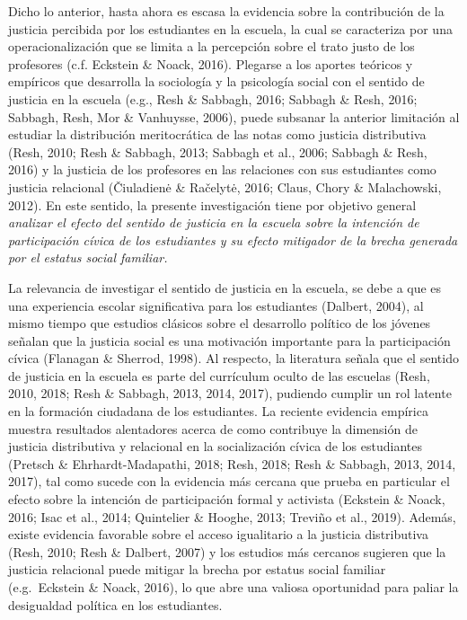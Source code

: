 \documentclass[12pt,twoside]{templates/facsothesis}
\begin{document}
Dicho lo anterior, hasta ahora es escasa la evidencia sobre la contribución de la justicia percibida por los estudiantes en la escuela, la cual se caracteriza por una operacionalización que se limita a la percepción sobre el trato justo de los profesores (c.f. Eckstein \& Noack, 2016). Plegarse a los aportes teóricos y empíricos que desarrolla la sociología y la psicología social con el sentido de justicia en la escuela (e.g., Resh \& Sabbagh, 2016; Sabbagh \& Resh, 2016; Sabbagh, Resh, Mor \& Vanhuysse, 2006), puede subsanar la anterior limitación al estudiar la distribución meritocrática de las notas como justicia distributiva (Resh, 2010; Resh \& Sabbagh, 2013; Sabbagh et al., 2006; Sabbagh \& Resh, 2016) y la justicia de los profesores en las relaciones con sus estudiantes como justicia relacional (Čiuladienė \& Račelytė, 2016; Claus, Chory \& Malachowski, 2012). En este sentido, la presente investigación tiene por objetivo general \emph{analizar el efecto del sentido de justicia en la escuela sobre la intención de participación cívica de los estudiantes y su efecto mitigador de la brecha generada por el estatus social familiar.}

La relevancia de investigar el sentido de justicia en la escuela, se debe a que es una experiencia escolar significativa para los estudiantes (Dalbert, 2004), al mismo tiempo que estudios clásicos sobre el desarrollo político de los jóvenes señalan que la justicia social es una motivación importante para la participación cívica (Flanagan \& Sherrod, 1998). Al respecto, la literatura señala que el sentido de justicia en la escuela es parte del currículum oculto de las escuelas (Resh, 2010, 2018; Resh \& Sabbagh, 2013, 2014, 2017), pudiendo cumplir un rol latente en la formación ciudadana de los estudiantes. La reciente evidencia empírica muestra resultados alentadores acerca de como contribuye la dimensión de justicia distributiva y relacional en la socialización cívica de los estudiantes (Pretsch \& Ehrhardt-Madapathi, 2018; Resh, 2018; Resh \& Sabbagh, 2013, 2014, 2017), tal como sucede con la evidencia más cercana que prueba en particular el efecto sobre la intención de participación formal y activista (Eckstein \& Noack, 2016; Isac et al., 2014; Quintelier \& Hooghe, 2013; Treviño et al., 2019). Además, existe evidencia favorable sobre el acceso igualitario a la justicia distributiva (Resh, 2010; Resh \& Dalbert, 2007) y los estudios más cercanos sugieren que la justicia relacional puede mitigar la brecha por estatus social familiar (e.g.~Eckstein \& Noack, 2016), lo que abre una valiosa oportunidad para paliar la desigualdad política en los estudiantes.
\end{document}
